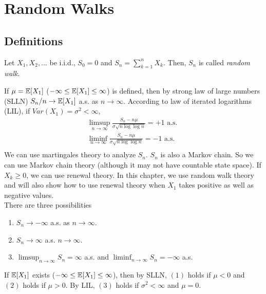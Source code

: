 \documentclass[all-lectures.tex]{subfiles}
\begin{document}

\setcounter{section}{1}
\setcounter{subsection}{1}
\chapter{Random Walks}
\section*{}
\chr
\section{Definitions}
\begin{defn}
Let $X_1,X_2,\dots$ be i.i.d., $S_0 = 0$ and $S_n = \sum_{k=1}^n X_k$. Then, $S_n$ is called \textit{random walk}. 
\end{defn}

If $\mu = \mathbb{E}[X_1]$ ($-\infty \leq \mathbb{E}[X_1] \leq \infty$) is defined, then by strong law of large numbers (SLLN) $S_n/n \to \mathbb{E}[X_1]$ a.s. as $n \to \infty$. According to law of iterated logarithms (LIL), if $Var(X_1) = \sigma^2 < \infty$,
\begin{align*}
\limsup_{n \to \infty} \frac{S_n-n\mu}{\sigma \sqrt{n\log \log n}} = +1 \text{ a.s. } \\
\liminf_{n \to \infty} \frac{S_n-n\mu}{\sigma \sqrt{n\log \log n}} = -1 \text{ a.s. } \\
\end{align*}
We can use martingales theory to analyze $S_n$. $S_n$ is also a Markov chain. So we can use Markov chain theory (although it may not have countable state space). If $X_k \geq 0$, we can use renewal theory. In this chapter, we use random walk theory and will also show how to use renewal theory when $X_1$ takes positive as well as negative values.\\
\indent There are three possibilities
\begin{enumerate}[label=(\arabic*)]
\item  $S_n \to -\infty$ a.s. as $n \to \infty$.
\item  $S_n \to \infty$ a.s. $n \to \infty$. 
\item  $\limsup_{n\to \infty} S_n = \infty$ a.s. and $\liminf_{n\to \infty} S_n = -\infty$ a.s.
\end{enumerate}
If $\mathbb{E}[X_1]$ exists ($-\infty \leq \mathbb{E}[X_1] \leq \infty$), then by SLLN, $(1)$ holds if $\mu <0$ and $(2)$ holds if $\mu>0$. By LIL, $(3)$ holds if $\sigma^2 < \infty$ and $\mu = 0$.
\end{document}
